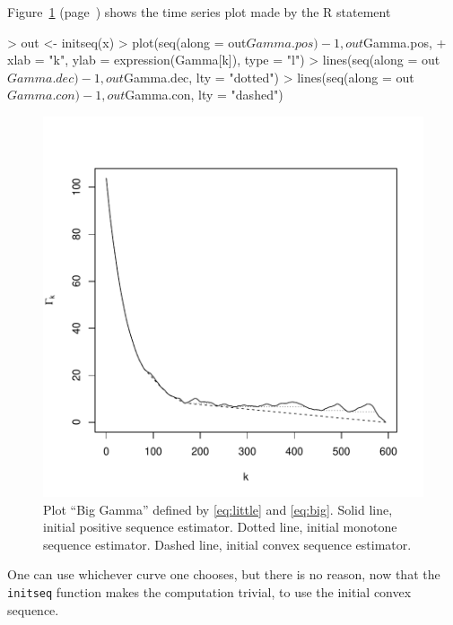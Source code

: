 \documentclass{article}
\begin{document}
Figure~\ref{fig:gamma} (page~\pageref{fig:gamma})
shows the time series plot made by the R statement
\begin{Schunk}
\begin{Sinput}
> out <- initseq(x)
> plot(seq(along = out$Gamma.pos) - 1, out$Gamma.pos,
+         xlab = "k", ylab = expression(Gamma[k]), type = "l")
> lines(seq(along = out$Gamma.dec) - 1, out$Gamma.dec, lty = "dotted")
> lines(seq(along = out$Gamma.con) - 1, out$Gamma.con, lty = "dashed")
\end{Sinput}
\end{Schunk}
\begin{figure}
\begin{center}
\includegraphics{comments_lme-figgam}
\end{center}
\caption{Plot ``Big Gamma'' defined by \eqref{eq:little} and \eqref{eq:big}.
Solid line, initial positive sequence estimator.
Dotted line, initial monotone sequence estimator.
Dashed line, initial convex sequence estimator.}
\label{fig:gamma}
\end{figure}
One can use whichever curve one chooses, but there is no reason, now that
the \texttt{initseq} function makes the computation trivial, to use the
initial convex sequence.
\end{document}
